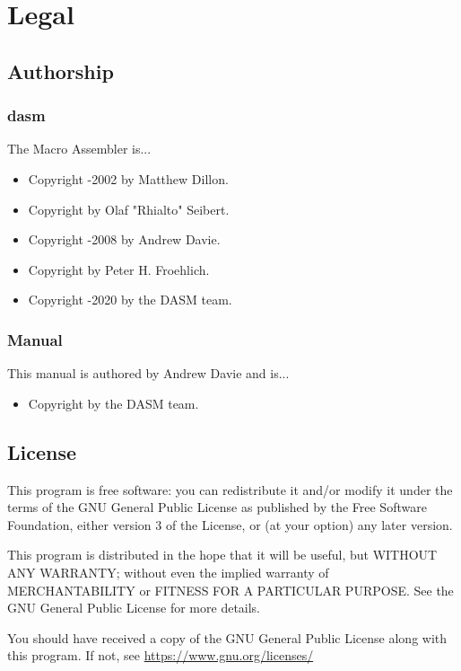  
\chapter{Legal}


\section{Authorship}
\subsection{dasm}

The \dasm Macro Assembler is...

\begin{itemize}
\item Copyright -2002 by Matthew Dillon.
\item Copyright  by Olaf "Rhialto" Seibert.
\item Copyright -2008 by Andrew Davie.
\item Copyright  by Peter H. Froehlich.
\item Copyright -2020 by the DASM team.
\end{itemize}

\subsection{Manual}
This manual is authored by Andrew Davie and is...

\begin{itemize}
\item Copyright  by the DASM team.
\end{itemize}

\pagebreak
\label{changelog:20200824license}
\section{License}

This program is free software: you can redistribute it and/or modify
it under the terms of the GNU General Public License as published by
the Free Software Foundation, either version 3 of the License, or
(at your option) any later version.

This program is distributed in the hope that it will be useful,
but WITHOUT ANY WARRANTY; without even the implied warranty of
MERCHANTABILITY or FITNESS FOR A PARTICULAR PURPOSE.  See the
GNU General Public License for more details.

You should have received a copy of the GNU General Public License
along with this program.  If not, see \url{https://www.gnu.org/licenses/}

